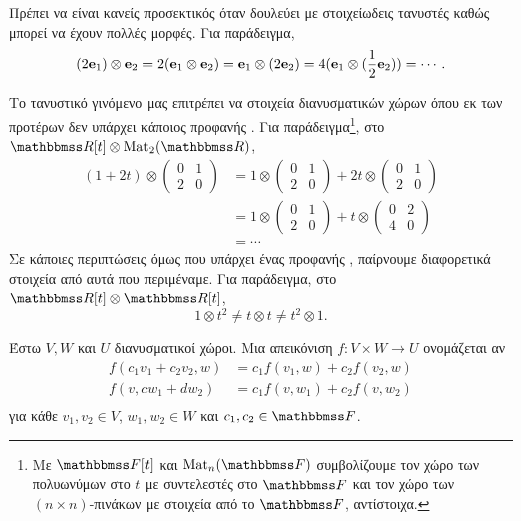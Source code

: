 \documentclass[12pt,a4paper,reqno]{amsart}
\newcommand{\defn}[1]{{\color{mylightblue}{#1}}}
\begin{document}
Πρέπει να είναι κανείς προσεκτικός όταν δουλεύει με στοιχείωδεις τανυστές καθώς μπορεί να έχουν πολλές  μορφές. Για παράδειγμα, 
\[
(2\mathbf{e}_1) \otimes \mathbf{e}_2 = 2(\mathbf{e}_1 \otimes \mathbf{e}_2) = \mathbf{e}_1 \otimes (2\mathbf{e}_2) = 4(\mathbf{e}_1 \otimes (\frac{1}{2}\mathbf{e}_2)) = \cdots. 
\]

Το τανυστικό γινόμενο μας επιτρέπει να  στοιχεία διανυσματικών χώρων όπου εκ των προτέρων δεν υπάρχει κάποιος προφανής . Για παράδειγμα\footnote{Με $\FF[t]$ και $\rmMat_n(\FF)$ συμβολίζουμε τον χώρο των πολυωνύμων στο $t$ με συντελεστές στο $\FF$ και τον χώρο των $(n\times n)$-πινάκων με στοιχεία από το $\FF$, αντίστοιχα.}, στο $\RR[t] \otimes \rmMat_2(\RR)$,
\begin{align*}
(1 + 2t) \otimes \begin{pmatrix}
    0 & 1 \\
    2 & 0 
\end{pmatrix} &= 
1 \otimes \begin{pmatrix}
    0 & 1 \\
    2 & 0 
\end{pmatrix} + 2t \otimes \begin{pmatrix}
    0 & 1 \\
    2 & 0 
\end{pmatrix} \\ 
&= 
1 \otimes \begin{pmatrix}
    0 & 1 \\
    2 & 0 
\end{pmatrix} + t \otimes \begin{pmatrix}
    0 & 2 \\
    4 & 0 
\end{pmatrix} \\
&= \cdots 
\end{align*}
Σε κάποιες περιπτώσεις όμως που υπάρχει ένας προφανής , παίρνουμε διαφορετικά στοιχεία από αυτά που περιμέναμε. Για παράδειγμα, στο $\RR[t] \otimes \RR[t]$, 
\[
1 \otimes t^2 \neq t \otimes t \neq t^2 \otimes 1.
\]

\begin{definition}
    \label{def:bilinear}
    Έστω $V, W$ και $U$ διανυσματικοί χώροι. Μια απεικόνιση $f: V\times W \to U$ ονομάζεται \defn{διγραμμική} αν 
    \begin{align*}
        f(c_1v_1 + c_2v_2, w) &= c_1f(v_1,w) + c_2f(v_2,w) \\
        f(v, cw_1+dw_2) &= c_1f(v,w_1) + c_2f(v,w_2) \\
    \end{align*}
    για κάθε $v_1, v_2 \in V$, $w_1, w_2 \in W$ και $c_1, c_2 \in \FF$.
\end{definition}
\end{document}
